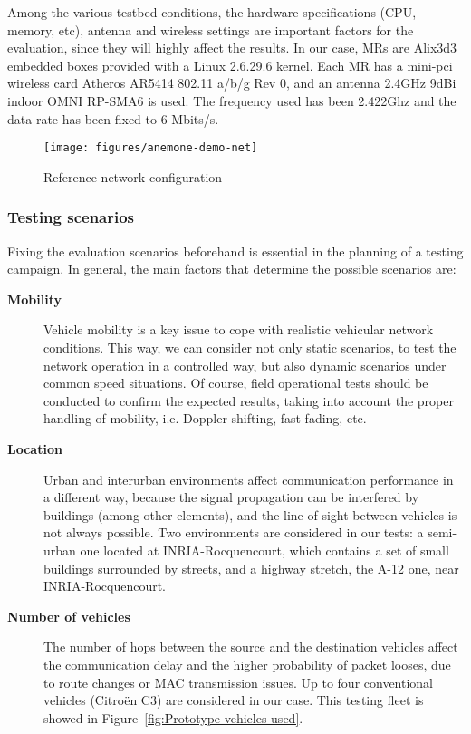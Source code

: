 \documentclass[fonts]{icst}
\begin{document}
Among the various testbed conditions, the hardware specifications (CPU, memory, etc),
antenna and wireless settings are important factors for the evaluation, since they will highly affect the results. In our case, MRs are Alix3d3 embedded boxes provided with a Linux 2.6.29.6 kernel. Each MR has a mini-pci wireless card Atheros AR5414 802.11 a/b/g Rev 0, and
an antenna 2.4GHz 9dBi indoor OMNI RP-SMA6 is used. The frequency used has been 2.422Ghz and the data rate has been fixed to 6 Mbits/s. 



\begin{figure}[htbp]
   \begin{center}
    \texttt{[image: figures/anemone-demo-net]}
      \caption{Reference network configuration}
      \label{fig:network-configuration}
  \end{center}
\end{figure}

\subsubsection{Testing scenarios}

Fixing the evaluation scenarios beforehand is essential in the planning of a testing campaign. In general, the main factors that determine the possible scenarios are:

\begin{description}

\item [\bf Mobility] Vehicle mobility is a key issue to cope with realistic
      vehicular network conditions. This way, we can consider not only static
      scenarios, to test the network operation in a controlled way, but also
      dynamic scenarios under common speed situations. Of course, field
      operational tests should be conducted to confirm the expected results,
      taking into account the proper handling of mobility, i.e. Doppler shifting,
      fast fading, etc.

\item [\bf Location] Urban and interurban environments affect communication
      performance in a different way, because the signal propagation can be
      interfered by buildings (among other elements), and the line of sight
      between vehicles is not always possible. Two environments are considered
      in our tests: a semi-urban one located at INRIA-Rocquencourt, which
      contains a set of small buildings surrounded by streets, and a highway
      stretch, the A-12 one, near INRIA-Rocquencourt. 

\item [\bf Number of vehicles] The number of hops between the source and the
      destination vehicles affect the communication delay and the higher
      probability of packet looses, due to route changes or MAC transmission
      issues. Up to four conventional vehicles (Citro{\"e}n C3)  are considered in our case. This testing fleet is
      showed in Figure~\ref{fig:Prototype-vehicles-used}. 

\end{description}
\end{document}
